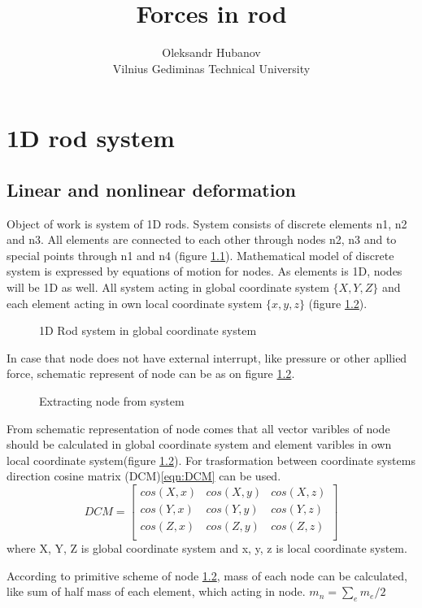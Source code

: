 \documentclass[12pt]{report}
\begin{document}
\title{Forces in rod}
\author{Oleksandr Hubanov\\
Vilnius Gediminas Technical University}
\maketitle
\tableofcontents
\part{1D rod system}
\chapter {Linear and nonlinear deformation}\par Object of work is system of 1D
rods. System consists of discrete elements n1, n2 and n3. All elements are
connected to each other through nodes n2, n3 and to special points through n1
and n4 (figure \ref{fig:rodSystem}). Mathematical model of discrete system is
expressed by equations of motion for nodes. As elements is 1D, nodes will be 1D
as well. All system acting in global coordinate system $\{X, Y, Z\}$ and each
element acting in own local coordinate system $\{x,y,z\}$ (figure
\ref{fig:nodeExtract}).\par
\begin{figure}[ht]
  \centering
      
  \caption{1D Rod system in global coordinate system}\label{fig:rodSystem}      
\end{figure}
In case that node does not have external interrupt, like pressure or other
apllied force, schematic represent of node can be as on figure
\ref{fig:nodeExtract}.\par
\begin{figure}[ht]
  \centering
      
  \caption{Extracting node from system}\label{fig:nodeExtract}
\end{figure}
From schematic representation of node comes that all vector varibles of node
should be calculated in global coordinate system and element varibles in own
local coordinate system(figure \ref{fig:nodeExtract}). For trasformation between
coordinate systems direction cosine matrix (DCM)\eqref{eqn:DCM} can be used.
\begin{equation}\label{eqn:DCM}
  DCM= \begin{bmatrix}
    cos(X,x)&cos(X,y)&cos(X,z)\\
    cos(Y,x)&cos(Y,y)&cos(Y,z)\\
    cos(Z,x)&cos(Z,y)&cos(Z,z)\\
   \end{bmatrix} 
\end{equation}
where {X, Y, Z} is global coordinate system and {x, y, z} is local coordinate
system.\par According to primitive scheme of node \ref{fig:nodeExtract}, mass of
each node can be calculated, like sum of half mass of each element, which acting
in node. $m_n=\sum_{e}m_e/2$\par
\end{document}
